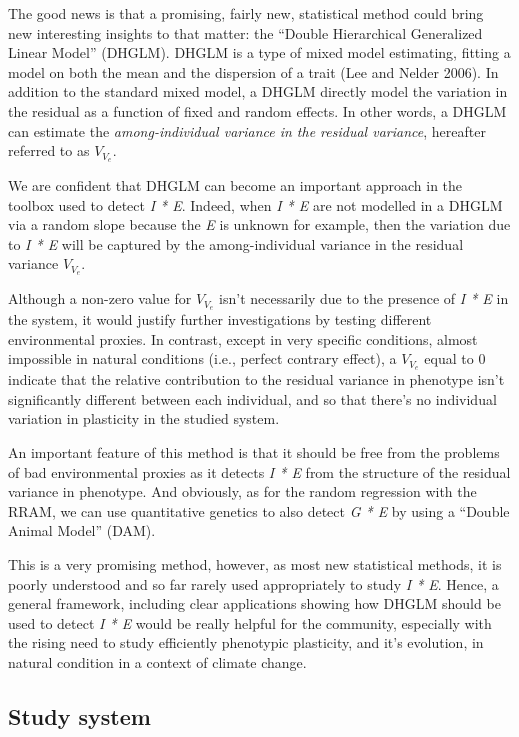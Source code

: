 \documentclass[
  12pt,
  letterpaper,
]{scrartcl}
\begin{document}
The good news is that a promising, fairly new, statistical method could
bring new interesting insights to that matter: the ``Double Hierarchical
Generalized Linear Model'' (DHGLM). DHGLM is a type of mixed model
estimating, fitting a model on both the mean and the dispersion of a
trait (Lee and Nelder 2006). In addition to the standard mixed model, a
DHGLM directly model the variation in the residual as a function of
fixed and random effects. In other words, a DHGLM can estimate the
\emph{among-individual variance in the residual variance}, hereafter
referred to as \(V_{V_e}\).

We are confident that DHGLM can become an important approach in the
toolbox used to detect \emph{I * E}. Indeed, when \emph{I * E} are not
modelled in a DHGLM via a random slope because the \emph{E} is unknown
for example, then the variation due to \emph{I * E} will be captured by
the among-individual variance in the residual variance \(V_{V_e}\).

Although a non-zero value for \(V_{V_e}\) isn't necessarily due to the
presence of \emph{I * E} in the system, it would justify further
investigations by testing different environmental proxies. In contrast,
except in very specific conditions, almost impossible in natural
conditions (i.e., perfect contrary effect), a \(V_{V_e}\) equal to 0
indicate that the relative contribution to the residual variance in
phenotype isn't significantly different between each individual, and so
that there's no individual variation in plasticity in the studied
system.

An important feature of this method is that it should be free from the
problems of bad environmental proxies as it detects \emph{I * E} from
the structure of the residual variance in phenotype. And obviously, as
for the random regression with the RRAM, we can use quantitative
genetics to also detect \emph{G * E} by using a ``Double Animal Model''
(DAM).

This is a very promising method, however, as most new statistical
methods, it is poorly understood and so far rarely used appropriately to
study \emph{I * E}. Hence, a general framework, including clear
applications showing how DHGLM should be used to detect \emph{I * E}
would be really helpful for the community, especially with the rising
need to study efficiently phenotypic plasticity, and it's evolution, in
natural condition in a context of climate change.

\subsection{Study system}\label{study-system}
\end{document}
